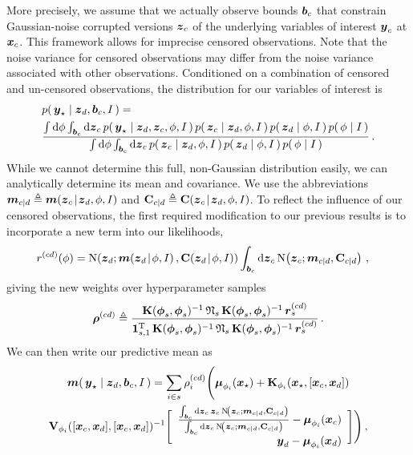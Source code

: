 \documentclass{acmtrans2m}
\begin{document}
More precisely, we assume that we actually observe bounds $\boldsymbol{b}_c$ that constrain Gaussian-noise corrupted versions $\boldsymbol{z}_c$ of the underlying variables of interest $\boldsymbol{y}_c$ at $\boldsymbol{x}_c$. This framework allows for imprecise censored observations. Note that the noise variance for censored observations may differ from the noise variance associated with other observations. Conditioned on a combination of censored and un-censored observations, the distribution for our variables of interest is
\begin{align} \label{eq:CensoredFull}
& \p{\vyst}{\vzD,\vect{b}_c,I}=\nonumber\\
& \frac{\int\ud\phi\int_{\vect{b}_c}\ud\vz_c\, \p{\vyst}{\vzD,\vz_c,\phi,I}\p{\vz_c}{\vzD,\phi,I}\p{\vzD}{\phi,I}\p{\phi}{I}}
{\int\ud\phi\int_{\vect{b}_c}\ud\vz_c\, \p{\vz_c}{\vzD,\phi,I}\p{\vzD}{\phi,I}\p{\phi}{I}}\,.
\end{align}
While we cannot determine this full, non-Gaussian distribution easily, we can analytically determine its mean and covariance. We use the abbreviations $\boldsymbol{m}_{c|d}\triangleq\boldsymbol{m}\!\left(\boldsymbol{z}_c\!\mid\!\boldsymbol{z}_d,\phi,I\right)$ and $\mathbf{C}_{c|d}\triangleq\mathbf{C}\!\left(\boldsymbol{z}_c\!\mid\!\boldsymbol{z}_d,\phi,I\right)$.
To reflect the influence of our censored observations, the first required modification to our previous results is to incorporate a new term into our likelihoods, 
\begin{align}
 r^{(cd)}(\phi) %
  &= \N{\vzD}{\meanskinny{\vzD}{\phi,I}}{\covskinny{\vzD}{\phi,I}}\int_{\vect{b}_c}\ud\vz_c\,\N{\vz_c}{\vect{m}_{c|d}}{\mat{C}_{c|d}}\,,
\end{align}
giving the new weights over hyperparameter samples
\begin{equation}
\boldsymbol{\rho}^{(cd)}\triangleq\frac{\mathbf{K}(\boldsymbol{\phi}_s,\boldsymbol{\phi}_s)^{-1}\,\mathbf{\mathfrak{N}}_s\,\mathbf{K}(\boldsymbol{\phi}_s,\boldsymbol{\phi}_s)^{-1}\,\boldsymbol{r}^{(cd)}_s}
{\mathbf{1}_{s,1}^{\mathrm{T}}\,\mathbf{K}(\boldsymbol{\phi}_s,\boldsymbol{\phi}_s)^{-1}\,\mathbf{\mathfrak{N}}_s\,\mathbf{K}(\boldsymbol{\phi}_s,\boldsymbol{\phi}_s)^{-1}\,\boldsymbol{r}^{(cd)}_s}\,.
\end{equation}
We can then write our predictive mean as
\begin{multline} \label{eq:CensoredMean}
\boldsymbol{m}\!\left(\,\boldsymbol{y}_\star\mid\boldsymbol{z}_d,\boldsymbol{b}_c,I\,\right)=\sum_{i\in s}\rho^{(cd)}_i\Biggl(\boldsymbol{\mu}_{\phi_i}(\boldsymbol{x}_\star)+\mathbf{K}_{\phi_i}(\boldsymbol{x}_\star,[\boldsymbol{x}_c,\boldsymbol{x}_d])\\\mathbf{V}_{\phi_i}([\boldsymbol{x}_c,\boldsymbol{x}_d],[\boldsymbol{x}_c,\boldsymbol{x}_d])^{-1}
\Biggl[\begin{array}{r}
	\frac{\int_{\boldsymbol{b}_c}\mathrm{d}\boldsymbol{z}_c\,\boldsymbol{z}_c\, \text{N}\!\left(\boldsymbol{z}_c;\boldsymbol{m}_{c|d},\mathbf{C}_{c|d}\right)}{\int_{\boldsymbol{b}_c}\mathrm{d}\boldsymbol{z}_c\,\text{N}\!\left(\boldsymbol{z}_c;\boldsymbol{m}_{c|d},\mathbf{C}_{c|d}\right)}-\boldsymbol{\mu}_{\phi_i}(\boldsymbol{x}_c)\\
       \boldsymbol{y}_d-\boldsymbol{\mu}_{\phi_i}(\boldsymbol{x}_d)
      \end{array}\Biggr]\Biggr)\,,
\end{multline}
\end{document}
